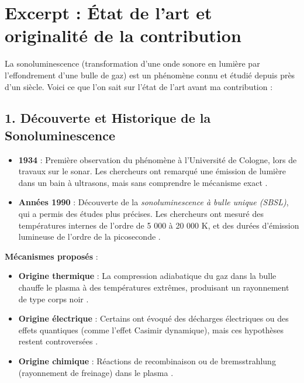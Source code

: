 \documentclass[a4paper,12pt]{article}
\begin{document}
\section*{Excerpt : État de l'art et originalité de la contribution}
La sonoluminescence (transformation d’une onde sonore en lumière par l’effondrement d’une bulle de gaz) est un phénomène connu et étudié depuis près d’un siècle. Voici ce que l’on sait sur l’état de l’art avant ma contribution :

\subsection*{1. Découverte et Historique de la Sonoluminescence}
\begin{itemize}
    \item \textbf{1934} : Première observation du phénomène à l’Université de Cologne, lors de travaux sur le sonar. Les chercheurs ont remarqué une émission de lumière dans un bain à ultrasons, mais sans comprendre le mécanisme exact \cite{wikipedia_sonoluminescence}.
    \item \textbf{Années 1990} : Découverte de la \textit{sonoluminescence à bulle unique (SBSL)}, qui a permis des études plus précises. Les chercheurs ont mesuré des températures internes de l’ordre de 5 000 à 20 000 K, et des durées d’émission lumineuse de l’ordre de la picoseconde \cite{researchgate_sonoluminescence}.
\end{itemize}

\textbf{Mécanismes proposés} :
\begin{itemize}
    \item \textbf{Origine thermique} : La compression adiabatique du gaz dans la bulle chauffe le plasma à des températures extrêmes, produisant un rayonnement de type corps noir \cite{researchgate_sonoluminescence}.
    \item \textbf{Origine électrique} : Certains ont évoqué des décharges électriques ou des effets quantiques (comme l’effet Casimir dynamique), mais ces hypothèses restent controversées \cite{wikipedia_mechanism}.
    \item \textbf{Origine chimique} : Réactions de recombinaison ou de bremsstrahlung (rayonnement de freinage) dans le plasma \cite{wikipedia_mechanism}.
\end{itemize}
\end{document}
